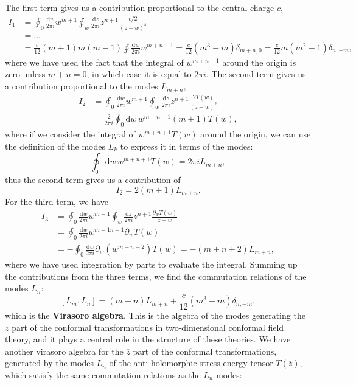 The first term gives us a contribution proportional to the central charge \(c\),
\[
    \begin{aligned}
        I_1 & = \oint_{0} \frac{\mathrm{d} w}{2\pi i} w^{m+1} \oint_{w} \frac{\mathrm{d} z}{2\pi i} z^{n+1} \frac{c / 2}{(z-w)^4}                                          \\
            & = \dots                                                                                                                                                      \\
            & = \frac{c}{12}(m+1) m (m - 1) \oint \frac{\mathrm{d} w}{2\pi i} w^{m+n-1} = \frac{c}{12} (m^3 - m) \delta_{m+n,0} = \frac{c}{12} m (m^2 - 1) \delta_{n, -m},
    \end{aligned}
\]
where we have used the fact that the integral of \(w^{m+n-1}\) around the origin is zero unless \(m+n=0\), in which case it is equal to \(2\pi i\). The second term gives us a contribution proportional to the modes \(L_{m+n}\),
\[
    \begin{aligned}
        I_2 & = \oint_{0} \frac{\mathrm{d} w}{2\pi i} w^{m+1} \oint_{w} \frac{\mathrm{d} z}{2\pi i} z^{n+1} \frac{2 T(w)}{(z-w)^2} \\
            & = \frac{2}{2 \pi i} \oint_{0} \mathrm{d} w \, w^{m + n + 1} (m+1) T(w),
    \end{aligned}
\]
where if we consider the integral of \(w^{m+n+1} T(w)\) around the origin, we can use the definition of the modes \(L_k\) to express it in terms of the modes:
\[
    \oint_{0} \mathrm{d} w \, w^{m + n + 1} T(w) = 2\pi i L_{m+n},
\]
thus the second term gives us a contribution of
\[
    I_2 = 2 (m+1) L_{m+n}.
\]
For the third term, we have
\[
    \begin{aligned}
        I_3 & = \oint_{0} \frac{\mathrm{d} w}{2\pi i} w^{m+1} \oint_{w} \frac{\mathrm{d} z}{2\pi i} z^{n+1} \frac{\partial_w T(w)}{z-w} \\
            & = \oint_{0} \frac{\mathrm{d} w}{2\pi i} w^{m+1 n+1} \partial_w T(w)                                                       \\
            & = - \oint_{0} \frac{\mathrm{d} w}{2 \pi i} \partial_w (w^{m+n+2}) T(w) = - (m+n+2) L_{m+n},
    \end{aligned}
\]
where we have used integration by parts to evaluate the integral. Summing up the contributions from the three terms, we find the commutation relations of the modes \(L_n\):
\[
    [L_m, L_n] = (m-n) L_{m+n} + \frac{c}{12} (m^3 - m) \delta_{n, -m},
\]
which is the \textbf{Virasoro algebra}. This is the algebra of the modes generating the \(z\) part of the conformal transformations in two-dimensional conformal field theory, and it plays a central role in the structure of these theories. We have another virasoro algebra for the \(\overline{z}\) part of the conformal transformations, generated by the modes \(\overline{L}_n\) of the anti-holomorphic stress energy tensor \(\overline{T}(\overline{z})\), which satisfy the same commutation relations as the \(L_n\) modes:
